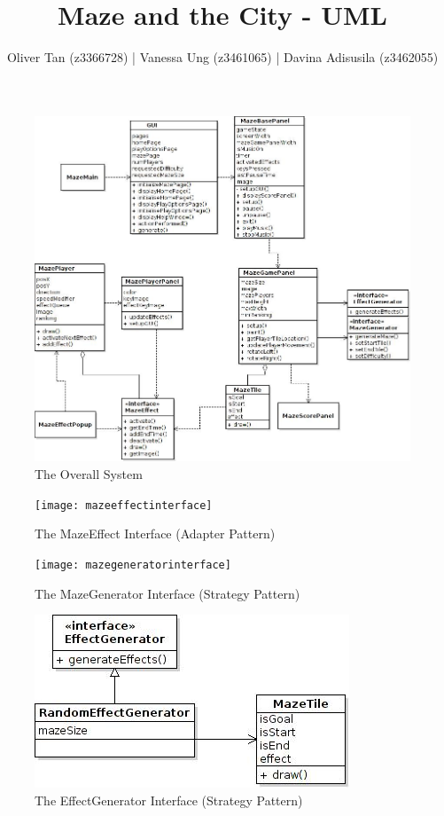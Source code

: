 \documentclass[a4paper,11pt]{article}
\begin{document}
\title{Maze and the City - UML}
\author{Oliver Tan (z3366728) | Vanessa Ung (z3461065) | Davina Adisusila (z3462055)}
\maketitle

\begin{figure}[ht!]
\centering
\includegraphics[width=\textwidth]{main}
\caption{The Overall System}
\end{figure}


\begin{figure}[ht!]
\centering
\texttt{[image: mazeeffectinterface]}
\caption{The MazeEffect Interface (Adapter Pattern)}
\end{figure}


\begin{figure}[ht!]
\centering
\texttt{[image: mazegeneratorinterface]}
\caption{The MazeGenerator Interface (Strategy Pattern)}
\end{figure}


\begin{figure}[ht!]
\centering
\includegraphics[width=\textwidth]{mazeeffectgeneratorinterface}
\caption{The EffectGenerator Interface (Strategy Pattern)}
\end{figure}

\end{document}
